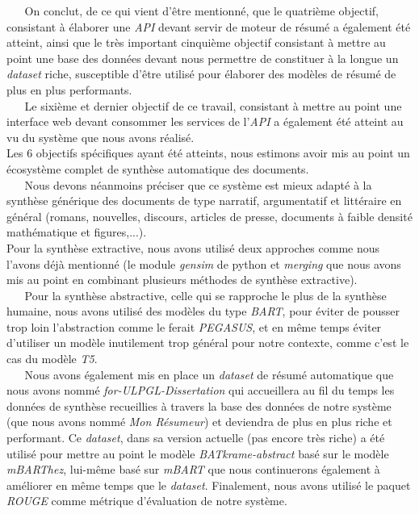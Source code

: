 $ _{} $ $ _{} $ $ _{} $ $ _{} $ $ _{} $On conclut, de ce qui  vient d'être mentionné, que le quatrième objectif, consistant à élaborer une \textit{API} devant servir de moteur de résumé a également été atteint, ainsi que le très important cinquième objectif consistant à mettre au point une base des données devant nous permettre de constituer à la longue un \textit{dataset} riche, susceptible d'être utilisé pour élaborer des modèles de résumé de plus en plus performants.\\
$ _{} $ $ _{} $ $ _{} $ $ _{} $ $ _{} $Le sixième et dernier objectif de ce travail, consistant à mettre au point une interface web devant consommer les services de l'\textit{API} a également été atteint au vu du système que nous avons réalisé.\\
Les $ 6 $ objectifs spécifiques ayant été atteints, nous estimons avoir mis au point un écosystème complet de synthèse automatique des documents.\\
$ _{} $ $ _{} $ $ _{} $ $ _{} $ $ _{} $Nous devons néanmoins préciser que ce système est mieux adapté à la synthèse générique des documents de type narratif, argumentatif et littéraire en général (romans, nouvelles, discours, articles de presse, documents à faible densité mathématique et figures,...).\\
Pour la synthèse extractive, nous avons utilisé deux approches comme nous l'avons déjà mentionné (le module \textit{gensim} de python et \textit{merging} que nous avons mis au point en combinant plusieurs méthodes de synthèse extractive).\\
$ _{} $ $ _{} $ $ _{} $ $ _{} $ $ _{} $Pour la synthèse abstractive, celle qui se rapproche le plus de la synthèse humaine, nous avons utilisé des modèles du type \textit{BART}, pour éviter de pousser trop loin l'abstraction comme le ferait \textit{PEGASUS}, et en même temps éviter d'utiliser un modèle inutilement trop général pour notre contexte, comme c'est le cas du modèle \textit{T5}.\\
$ _{} $ $ _{} $ $ _{} $ $ _{} $ $ _{} $Nous avons également mis en place un \textit{dataset} de résumé automatique que nous avons nommé \textit{for-ULPGL-Dissertation} qui accueillera au fil du temps les données de synthèse recueillies à travers la base des données de notre système (que nous avons nommé \textit{Mon Résumeur}) et deviendra de plus en plus riche et performant. Ce \textit{dataset}, dans sa version actuelle (pas encore très riche) a été utilisé pour mettre au point le modèle \textit{BATkrame-abstract} basé sur le modèle \textit{mBARThez}, lui-même basé sur \textit{mBART} que nous continuerons également à améliorer en même temps que le \textit{dataset}. Finalement, nous avons utilisé le paquet \textit{ROUGE} comme métrique d'évaluation de notre système.\\

